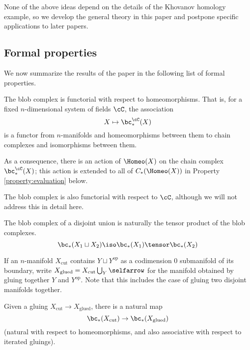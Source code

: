 None of the above ideas depend on the details of the Khovanov homology example,
so we develop the general theory in this paper and postpone specific applications
to later papers.



\subsection{Formal properties}
\label{sec:properties}
We now summarize the results of the paper in the following list of formal properties.

\begin{property}[Functoriality]
\label{property:functoriality}%
The blob complex is functorial with respect to homeomorphisms. That is, 
for a fixed $n$-dimensional system of fields $\cC$, the association
\begin{equation*}
X \mapsto \bc_*^{\cC}(X)
\end{equation*}
is a functor from $n$-manifolds and homeomorphisms between them to chain complexes and isomorphisms between them.
\end{property}
As a consequence, there is an action of $\Homeo(X)$ on the chain complex $\bc_*^\cC(X)$; this action is extended to all of $C_*(\Homeo(X))$ in Property \ref{property:evaluation} below.

The blob complex is also functorial with respect to $\cC$, although we will not address this in detail here. 

\begin{property}
\label{property:disjoint-union}
The blob complex of a disjoint union is naturally the tensor product of the blob complexes.
\begin{equation*}
\bc_*(X_1 \du X_2) \iso \bc_*(X_1) \tensor \bc_*(X_2)
\end{equation*}
\end{property}

If an $n$-manifold $X_\text{cut}$ contains $Y \sqcup Y^\text{op}$ as a codimension $0$ submanifold of its boundary, write $X_\text{glued} = X_\text{cut} \bigcup_{Y}\selfarrow$ for the manifold obtained by gluing together $Y$ and $Y^\text{op}$. Note that this includes the case of gluing two disjoint manifolds together.
\begin{property}
\label{property:gluing-map}%
Given a gluing $X_\mathrm{cut} \to X_\mathrm{glued}$, there is
a natural map
\[
	\bc_*(X_\mathrm{cut}) \to \bc_*(X_\mathrm{glued}) 
\]
(natural with respect to homeomorphisms, and also associative with respect to iterated gluings).
\end{property}

